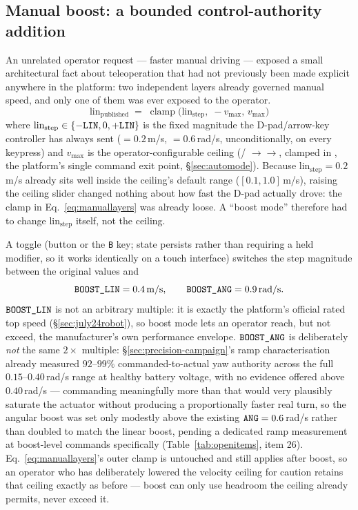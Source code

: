 \subsection{Manual boost: a bounded control-authority addition}
\label{sec:july24boost}
An unrelated operator request — faster manual driving — exposed a small
architectural fact about teleoperation that had not previously been made
explicit anywhere in the platform: two independent layers already governed
manual speed, and only one of them was ever exposed to the operator.
\begin{equation}
\text{lin}_{\text{published}} \;=\; \operatorname{clamp}\big(\text{lin}_{\text{step}},\; -v_{\max},\, v_{\max}\big)
\label{eq:manuallayers}
\end{equation}
where $\text{lin}_{\text{step}}\in\{-\code{LIN},0,+\code{LIN}\}$ is the
fixed magnitude the D-pad/arrow-key controller has always sent
($=0.2$\,m/s, $=0.6$\,rad/s, unconditionally, on every
keypress) and $v_{\max}$ is the operator-configurable ceiling
(/
$\to$$\to$,
clamped in , the platform's single command exit point,
\S\ref{sec:automode}). Because $\text{lin}_{\text{step}}=0.2$\,m/s already
sits well inside the ceiling's default range ($[0.1,1.0]$\,m/s), raising
the ceiling slider changed nothing about how fast the D-pad actually
drove: the clamp in Eq.~\ref{eq:manuallayers} was already loose. A ``boost
mode'' therefore had to change $\text{lin}_{\text{step}}$ itself, not the
ceiling.

A toggle (button or the \texttt{B} key; state persists rather than
requiring a held modifier, so it works identically on a touch interface)
switches the step magnitude between the original values and
\begin{equation}
\code{BOOST\_LIN} = 0.4\text{\,m/s}, \qquad \code{BOOST\_ANG} = 0.9\text{\,rad/s}.
\label{eq:boostvalues}
\end{equation}
$\code{BOOST\_LIN}$ is not an arbitrary multiple: it is exactly the
platform's official rated top speed (\S\ref{sec:july24robot}), so boost
mode lets an operator reach, but not exceed, the manufacturer's own
performance envelope. $\code{BOOST\_ANG}$ is deliberately \emph{not} the
same $2\times$ multiple: \S\ref{sec:precision-campaign}'s ramp
characterisation already measured $92$--$99\%$ commanded-to-actual yaw
authority across the full $0.15$--$0.40$\,rad/s range at healthy battery
voltage, with no evidence offered above $0.40$\,rad/s — commanding
meaningfully more than that would very plausibly saturate the actuator
without producing a proportionally faster real turn, so the angular boost
was set only modestly above the existing $\code{ANG}=0.6$\,rad/s rather
than doubled to match the linear boost, pending a dedicated ramp
measurement at boost-level commands specifically (Table~\ref{tab:openitems},
item 26). Eq.~\ref{eq:manuallayers}'s outer clamp is untouched and still
applies after boost, so an operator who has deliberately lowered the
velocity ceiling for caution retains that ceiling exactly as before —
boost can only use headroom the ceiling already permits, never exceed it.

